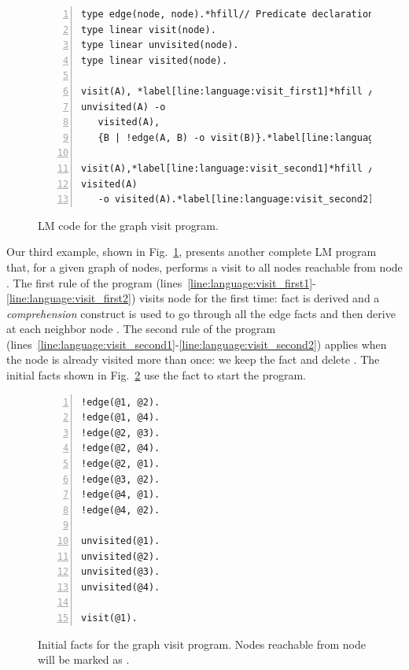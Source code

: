
\begin{figure}[h!]
\begin{Verbatim}[numbers=left,fontsize=\codesize,commandchars=\*\[\]]
type edge(node, node).*hfill// Predicate declaration
type linear visit(node).
type linear unvisited(node).
type linear visited(node).

visit(A), *label[line:language:visit_first1]*hfill // Rule 1: visit node
unvisited(A) -o
   visited(A),
   {B | !edge(A, B) -o visit(B)}.*label[line:language:visit_first2]*label[line:language:visit_comprehension]

visit(A),*label[line:language:visit_second1]*hfill // Rule 2: node already visited
visited(A)
   -o visited(A).*label[line:language:visit_second2]
\end{Verbatim}
  \caption{LM code for the graph visit program.}
  \label{code:language:visit}
\end{figure}

Our third example, shown in Fig.~\ref{code:language:visit}, presents another
complete LM program that, for a given graph of nodes, performs a visit to all
nodes reachable from node . The first rule of the program
(lines~\ref{line:language:visit_first1}-\ref{line:language:visit_first2}) visits
node  for the first time: fact  is derived and a
\emph{comprehension} construct is used to go through all the edge facts and then
derive  at each neighbor node . The second rule of the
program
(lines~\ref{line:language:visit_second1}-\ref{line:language:visit_second2})
applies when the node is already visited more than once: we keep the
 fact and delete . The initial facts shown in
Fig.~\ref{code:language:visit_initial} use the  fact to start
the program.

\begin{figure}[h!]
\begin{Verbatim}[numbers=left,fontsize=\codesize,commandchars=\*\[\]]
!edge(@1, @2).
!edge(@1, @4).
!edge(@2, @3).
!edge(@2, @4).
!edge(@2, @1).
!edge(@3, @2).
!edge(@4, @1).
!edge(@4, @2).

unvisited(@1).
unvisited(@2).
unvisited(@3).
unvisited(@4).

visit(@1).
\end{Verbatim}
  \caption{Initial facts for the graph visit program. Nodes reachable from node  will be marked as .}
  \label{code:language:visit_initial}
\end{figure}

